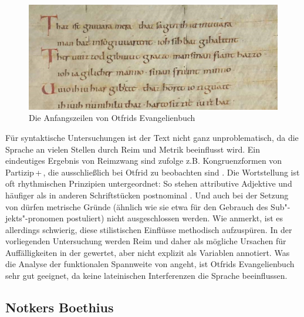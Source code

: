 \begin{figure}[h]
\begin{center}
  \includegraphics[width=10 cm]{images/otfrid-handschrift-ausschnitt.jpg}
  \caption {Die Anfangszeilen von Otfrids Evangelienbuch}
\label{abb:otfrid-hand}
\end{center}
\end{figure} 



Für syntaktische Untersuchungen ist der Text nicht ganz unproblematisch, da die Sprache an vielen Stellen durch Reim und Metrik beeinflusst wird. Ein eindeutiges Ergebnis von  Reimzwang  sind \textcite[35--36]{Fleischer2006} zufolge z.B. Kongruenzformen von Partizip\,+\,, die ausschließlich bei Otfrid zu beobachten sind \parencites()()[s. auch][52]{Fleischer2011}[]{Gillmann2016}. 
Die Wortstellung ist oft rhythmischen Prinzipien untergeordnet: So stehen attributive Adjektive und  häufiger als in anderen Schriftstücken postnominal \parencites()()[282--283]{Oubouzar1989}[29]{Schrodt2004}. Und auch bei der Setzung von  dürfen metrische  Gründe (ähnlich wie  \textcite{Eggenberger1961} sie etwa für den Gebrauch des  Sub"-jekts"-pronomen postuliert) nicht ausgeschlossen werden. Wie \textcite[37]{Fleischer2006} anmerkt, ist es allerdings schwierig, diese stilistischen Einflüsse methodisch aufzuspüren. In der vorliegenden Untersuchung werden Reim  und  daher als mögliche Ursachen für Auffälligkeiten in der  gewertet, aber nicht explizit als Variablen annotiert. Was die Analyse der funktionalen Spannweite von  angeht, ist Otfrids Evangelienbuch sehr gut geeignet, da keine lateinischen Interferenzen die Sprache beeinflussen. 

\subsection{Notkers Boethius} \label{sec:notker}

